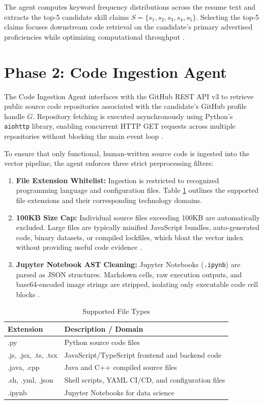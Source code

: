 The agent computes keyword frequency distributions across the resume text and extracts the top-5 candidate skill claims $S = \{s_1, s_2, s_3, s_4, s_5\}$. Selecting the top-5 claims focuses downstream code retrieval on the candidate's primary advertised proficiencies while optimizing computational throughput \cite{ref10, ref27}.

\section{Phase 2: Code Ingestion Agent}

The Code Ingestion Agent interfaces with the GitHub REST API v3 \cite{ref12} to retrieve public source code repositories associated with the candidate's GitHub profile handle $G$. Repository fetching is executed asynchronously using Python's \texttt{aiohttp} library, enabling concurrent HTTP GET requests across multiple repositories without blocking the main event loop \cite{ref35}.

To ensure that only functional, human-written source code is ingested into the vector pipeline, the agent enforces three strict preprocessing filters:
\begin{enumerate}[leftmargin=*, label=\arabic*.]
    \item \textbf{File Extension Whitelist:} Ingestion is restricted to recognized programming language and configuration files. Table \ref{tab:filetypes} outlines the supported file extensions and their corresponding technology domains.
    \item \textbf{100KB Size Cap:} Individual source files exceeding 100KB are automatically excluded. Large files are typically minified JavaScript bundles, auto-generated code, binary datasets, or compiled lockfiles, which bloat the vector index without providing useful code evidence \cite{ref15, ref24}.
    \item \textbf{Jupyter Notebook AST Cleaning:} Jupyter Notebooks (\texttt{.ipynb}) are parsed as JSON structures. Markdown cells, raw execution outputs, and base64-encoded image strings are stripped, isolating only executable code cell blocks \cite{ref26}.
\end{enumerate}

\begin{table}[htbp]
\centering
\small
\setlength{\tabcolsep}{10pt}
\caption{Supported File Types}
\label{tab:filetypes}
\begin{tabularx}{\textwidth}{@{}lX@{}}
\toprule
\textbf{Extension} & \textbf{Description / Domain} \\ \midrule
.py & Python source code files \\
.js, .jsx, .ts, .tsx & JavaScript/TypeScript frontend and backend code \\
.java, .cpp & Java and C++ compiled source files \\
.sh, .yml, .json & Shell scripts, YAML CI/CD, and configuration files \\
.ipynb & Jupyter Notebooks for data science \\ \bottomrule
\end{tabularx}
\end{table}

